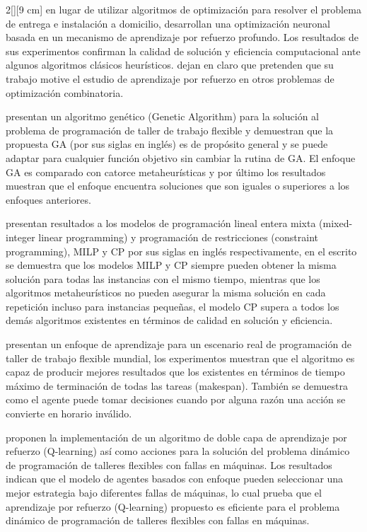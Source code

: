 \documentclass[letterpaper, 10 pt]{article}
\begin{document}
\begin{multicols}{2}[][9 cm]
\cite{QIU2022108362} en lugar de utilizar algoritmos de optimización para resolver el problema de entrega e instalación a domicilio, desarrollan una optimización neuronal basada en un mecanismo de aprendizaje por refuerzo profundo. Los resultados de sus experimentos confirman la calidad de solución y  eficiencia computacional ante algunos algoritmos clásicos heurísticos. \cite{QIU2022108362} dejan en claro que pretenden que su trabajo motive el estudio de aprendizaje por refuerzo en otros problemas de optimización combinatoria.

\cite{pezzella2008genetic} presentan un algoritmo genético (Genetic Algorithm) para la solución al problema de programación de taller de trabajo flexible y demuestran que la propuesta GA (por sus siglas en inglés) es de propósito general y se puede adaptar para cualquier función objetivo sin cambiar la rutina de GA. El enfoque GA es comparado con catorce metaheurísticas y por último los resultados muestran que el enfoque encuentra soluciones que son iguales o superiores a los enfoques anteriores.

 \cite{MENG2020106347} presentan resultados a los modelos de programación lineal entera mixta (mixed-integer linear programming) y programación de restricciones (constraint programming), MILP y CP por sus siglas en inglés respectivamente, en el escrito se demuestra que los modelos MILP y CP siempre pueden obtener la misma solución para todas las instancias con el mismo tiempo, mientras que los algoritmos metaheurísticos no pueden asegurar la misma solución en cada repetición incluso para instancias pequeñas, el modelo CP supera a todos los demás algoritmos existentes en términos de calidad en solución y eficiencia. 

\cite{palacio2022q} presentan un enfoque de aprendizaje para un escenario real de programación de taller de trabajo flexible mundial, los experimentos muestran que el algoritmo es capaz de producir mejores resultados que los existentes en términos de tiempo máximo de terminación de todas las tareas (makespan). También se demuestra como el agente puede tomar decisiones cuando por alguna razón una acción se convierte en horario inválido.

\cite{zhao2019improved} proponen la implementación de un algoritmo de doble capa de aprendizaje por refuerzo (Q-learning) así como acciones para la solución del problema dinámico de programación de talleres flexibles con fallas en máquinas. Los resultados indican que el modelo de agentes basados con enfoque pueden seleccionar una mejor estrategia bajo diferentes fallas de máquinas, lo cual prueba que el aprendizaje por refuerzo (Q-learning) propuesto es eficiente para el problema dinámico de programación de talleres flexibles con fallas en máquinas.

\end{multicols}
\end{document}
